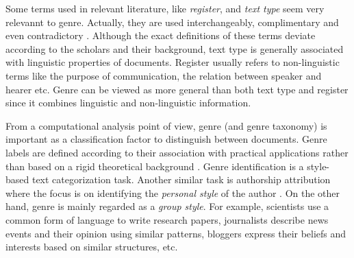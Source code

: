 Some terms used in relevant literature, like \textit{register}, and \textit{text type} seem very relevannt to genre. Actually, they are used interchangeably, complimentary and even contradictory \parencite{melissourgou2017genre}. Although the exact definitions of these terms deviate according to the scholars and their background, text type is generally associated with linguistic properties of documents. Register usually refers to non-linguistic terms like the purpose of communication, the relation between speaker and hearer etc. Genre can be viewed as more general than both text type and register since it combines linguistic and non-linguistic information.




From a computational analysis point of view, genre (and genre taxonomy) is important as a classification factor to distinguish between documents. Genre labels are defined according to their association with practical applications rather than based on a rigid theoretical background \parencite{kanaris2009learning,meyer2004genre,santini2007automatic}. Genre identification is a style-based text categorization task. Another similar task is authorship attribution where the focus is on identifying the \textit{personal style} of the author \parencite{stamatatos2009survey,koppel2011authorship,koppel2014determining}. On the other hand, genre is mainly regarded as a \textit{group style}. For example, scientists use a common form of language to write research papers, journalists describe news events and their opinion using similar patterns, bloggers express their beliefs and interests based on similar structures, etc.

